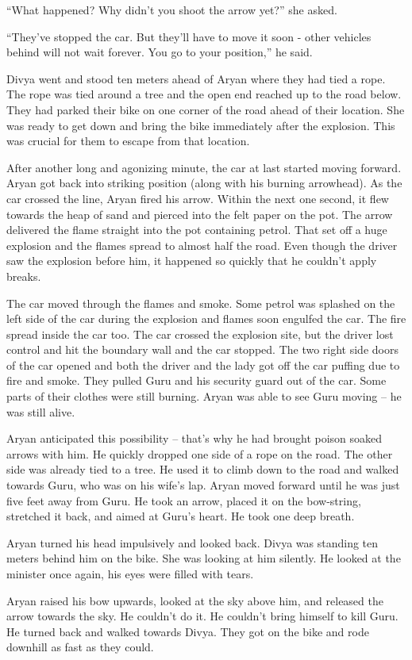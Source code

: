 “What happened? Why didn't you shoot the arrow yet?” she asked.

“They've stopped the car. But they'll have to move it soon - other vehicles
behind will not wait forever. You go to your position,” he said.

Divya went and stood ten meters ahead of Aryan where they had tied a rope. The
rope was tied around a tree and the open end reached up to the road below. They
had parked their bike on one corner of the road ahead of their location. She was
ready to get down and bring the bike immediately after the explosion. This was
crucial for them to escape from that location.

After another long and agonizing minute, the car at last started moving forward.
Aryan got back into striking position (along with his burning arrowhead). As the
car crossed the line, Aryan fired his arrow. Within the next one second, it flew
towards the heap of sand and pierced into the felt paper on the pot. The arrow
delivered the flame straight into the pot containing petrol. That set off a
huge explosion and the flames spread to almost half the road. Even though the
driver saw the explosion before him, it happened so quickly that he couldn't
apply breaks.

The car moved through the flames and smoke. Some petrol was splashed
on the left side of the car during the explosion and flames soon engulfed the
car. The fire spread inside the car too. The car crossed the explosion site, but
the driver lost control and hit the boundary wall and the car stopped. The two
right side doors of the car opened and both the driver and the lady got off the
car puffing due to fire and smoke. They pulled Guru and his security guard out
of the car. Some parts of their clothes were still burning. Aryan was able to
see Guru moving – he was still alive.

Aryan anticipated this possibility – that's why he had brought poison soaked
arrows with him. He quickly dropped one side of a rope on the road. The other
side was already tied to a tree. He used it to climb down to the road and walked
towards Guru, who was on his wife's lap. Aryan moved forward until he was just
five feet away from Guru. He took an arrow, placed it on the bow-string,
stretched it back, and aimed at Guru's heart. He took one deep breath.

Aryan turned his head impulsively and looked back. Divya was standing ten meters
behind him on the bike. She was looking at him silently. He looked at the
minister once again, his eyes were filled with tears.

Aryan raised his bow upwards, looked at the sky above him, and released the
arrow towards the sky. He couldn't do it. He couldn't bring himself to kill
Guru. He turned back and walked towards Divya. They got on the bike and rode
downhill as fast as they could.